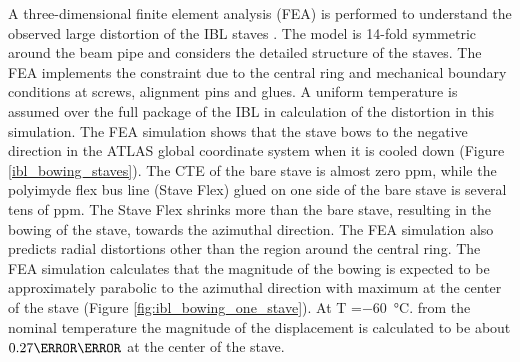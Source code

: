 A three-dimensional finite element analysis (FEA) is performed to understand the observed large distortion of the IBL staves \cite{ibl_bowing_1}. The model is 14-fold symmetric around the beam pipe and considers the detailed structure of the staves. The FEA implements the constraint due to the central ring and mechanical boundary conditions at screws, alignment pins and
glues. A uniform temperature is assumed over the full package of the IBL in calculation of the distortion
in this simulation.
The FEA simulation shows that the stave bows to the negative direction in the ATLAS global coordinate
system when it is cooled down (Figure \ref{ibl_bowing_staves}). The CTE of the bare stave is almost zero ppm, while the
polyimyde flex bus line (Stave Flex) glued on one side of the bare stave is several tens of ppm. The Stave Flex shrinks more than the bare stave, resulting in the bowing of the stave, towards
the azimuthal direction. The FEA simulation also predicts radial distortions other than the region around
the central ring.
The FEA simulation calculates that the magnitude of the bowing is expected to be approximately parabolic
to the azimuthal direction with maximum at the center of the stave (Figure \ref{fig:ibl_bowing_one_stave}). At T =\SI{-60}{\celsius}.
from the nominal temperature the magnitude of the displacement is calculated to be about $0.27 \milli \meter$
at the center of the stave. 

